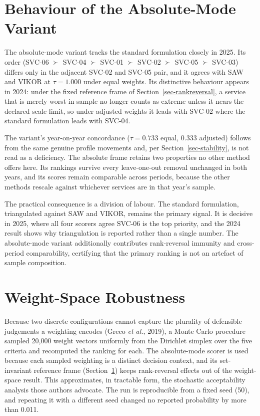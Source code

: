 \documentclass[
  12pt,
  letterpaper,
  12pt,
  oneside,
  english,
  onehalfspacing,
  headsepline]{MastersDoctoralThesis}
\begin{document}
\section{Behaviour of the Absolute-Mode Variant}\label{sec-absolutemode}

The absolute-mode variant tracks the standard formulation closely in
2025. Its order (SVC-06 \(\succ\) SVC-04 \(\succ\) SVC-01 \(\succ\)
SVC-02 \(\succ\) SVC-05 \(\succ\) SVC-03) differs only in the adjacent
SVC-02 and SVC-05 pair, and it agrees with SAW and VIKOR at
\(\tau = 1.000\) under equal weights. Its distinctive behaviour appears
in 2024: under the fixed reference frame of
Section~\ref{sec-rankreversal}, a service that is merely worst-in-sample
no longer counts as extreme unless it nears the declared scale limit, so
under adjusted weights it leads with SVC-02 where the standard
formulation leads with SVC-04.

The variant's year-on-year concordance (\(\tau = 0.733\) equal,
\(0.333\) adjusted) follows from the same genuine profile movements and,
per Section~\ref{sec-stability}, is not read as a deficiency. The
absolute frame retains two properties no other method offers here. Its
rankings survive every leave-one-out removal unchanged in both years,
and its scores remain comparable across periods, because the other
methods rescale against whichever services are in that year's sample.

The practical consequence is a division of labour. The standard
formulation, triangulated against SAW and VIKOR, remains the primary
signal. It is decisive in 2025, where all four scorers agree SVC-06 is
the top priority, and the 2024 result shows why triangulation is
reported rather than a single number. The absolute-mode variant
additionally contributes rank-reversal immunity and cross-period
comparability, certifying that the primary ranking is not an artefact of
sample composition.

\section{Weight-Space Robustness}\label{sec-montecarlo}

Because two discrete configurations cannot capture the plurality of
defensible judgements a weighting encodes (Greco \emph{et al.}, 2019), a
Monte Carlo procedure sampled 20,000 weight vectors uniformly from the
Dirichlet simplex over the five criteria and recomputed the ranking for
each. The absolute-mode scorer is used because each sampled weighting is
a distinct decision context, and its set-invariant reference frame
(Section~\ref{sec-absolutemode}) keeps rank-reversal effects out of the
weight-space result. This approximates, in tractable form, the
stochastic acceptability analysis those authors advocate. The run is
reproducible from a fixed seed (50), and repeating it with a different
seed changed no reported probability by more than 0.011.
\end{document}
